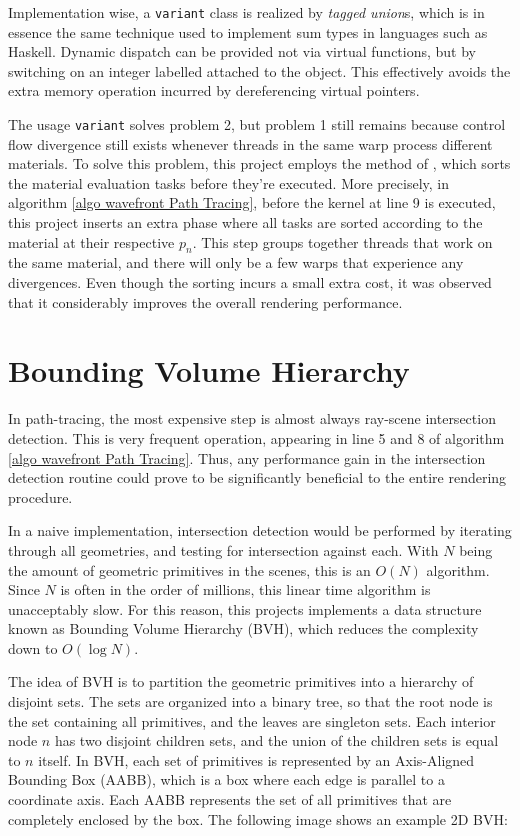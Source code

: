 Implementation wise, a \texttt{variant} class is realized by \textit{tagged union}s, which is in essence the same technique used to implement sum types in languages such as Haskell. Dynamic dispatch can be provided not via virtual functions, but by switching on an integer labelled attached to the object. This effectively avoids the extra memory operation incurred by dereferencing virtual pointers.

The usage \texttt{variant} solves problem 2, but problem 1 still remains because control flow divergence still exists whenever threads in the same warp process different materials. To solve this problem, this project employs the method of \cite{megakernel}, which sorts the material evaluation tasks before they're executed. More precisely, in algorithm \ref{algo wavefront Path Tracing}, before the kernel at line 9 is executed, this project inserts an extra phase where all tasks are sorted according to the material at their respective $p_n$. This step groups together threads that work on the same material, and there will only be a few warps that experience any divergences. Even though the sorting incurs a small extra cost, it was observed that it considerably improves the overall rendering performance.



\section{Bounding Volume Hierarchy}
In path-tracing, the most expensive step is almost always ray-scene intersection detection. This is very frequent operation, appearing in line 5 and 8 of algorithm \ref{algo wavefront Path Tracing}. Thus, any performance gain in the intersection detection routine could prove to be significantly beneficial to the entire rendering procedure. 

In a naive implementation, intersection detection would be performed by iterating through all geometries, and testing for intersection against each. With $N$ being the amount of geometric primitives in the scenes, this is an $O(N)$ algorithm. Since $N$ is often in the order of millions, this linear time algorithm is unacceptably slow. For this reason, this projects implements a data structure known as Bounding Volume Hierarchy (BVH), which reduces the complexity down to $O(\log N)$.

The idea of BVH is to partition the geometric primitives into a hierarchy of disjoint sets. The sets are organized into a binary tree, so that the root node is the set containing all primitives, and the leaves are singleton sets. Each interior node $n$ has two disjoint children sets, and the union of the children sets is equal to $n$ itself. In BVH, each set of primitives is represented by an Axis-Aligned Bounding Box (AABB), which is a box where each edge is parallel to a coordinate axis. Each AABB represents the set of all primitives that are completely enclosed by the box. The following image shows an example 2D BVH:

